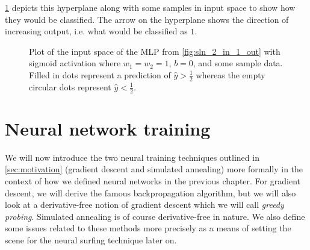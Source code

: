\begin{example}
    \ref{fig:sigmoid_hyperplane} depicts this hyperplane along with some samples in input space to show how they would be classified. 
    The arrow on the hyperplane shows the direction of increasing output, i.e. what would be classified as $1$.
    \begin{figure}
        \centering
        \caption{Plot of the input space of the MLP from \ref{fig:sln_2_in_1_out} with sigmoid activation where $w_1=w_2=1$, $b=0$, and some sample data. Filled in dots represent a prediction of $\hat{y}>\frac{1}{2}$ whereas the empty circular dots represent $\hat{y}<\frac{1}{2}$.}
        \label{fig:sigmoid_hyperplane}
    \end{figure}
\end{example}

\chapter{Neural network training}
\label{chap:neural_training}
We will now introduce the two neural training techniques outlined in \ref{sec:motivation} (gradient descent and simulated annealing) more formally in the context of how we defined neural networks in the previous chapter.
For gradient descent, we will derive the famous backpropagation algorithm, but we will also look at a derivative-free notion of gradient descent which we will call \textit{greedy probing}.
Simulated annealing is of course derivative-free in nature.
We also define some issues related to these methods more precisely as a means of setting the scene for the neural surfing technique later on.

